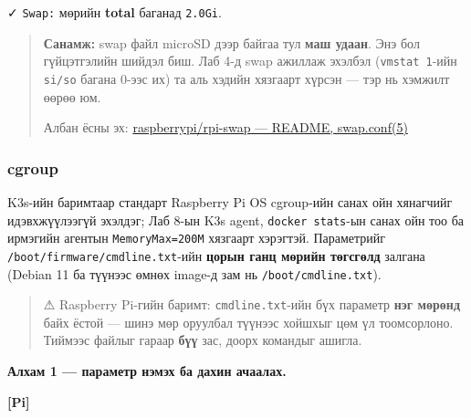 ✓ \texttt{Swap:} мөрийн \textbf{total} баганад \texttt{2.0Gi}.

\begin{quote}
\textbf{Санамж:} swap файл microSD дээр байгаа тул \textbf{маш удаан}. Энэ бол гүйцэтгэлийн шийдэл биш. Лаб 4-д swap ажиллаж эхэлбэл (\texttt{vmstat\ 1}-ийн \texttt{si/so} багана 0-ээс их) та аль хэдийн хязгаарт хүрсэн --- тэр нь хэмжилт өөрөө юм.

Албан ёсны эх: \href{https://github.com/raspberrypi/rpi-swap}{raspberrypi/\allowbreak{}rpi-swap --- README, swap.\allowbreak{}conf(5)}
\end{quote}

\hypertarget{cgroup}{%
\subsubsection{cgroup}\label{cgroup}}

K3s-ийн баримтаар стандарт Raspberry Pi OS cgroup-ийн санах ойн хянагчийг идэвхжүүлээгүй эхэлдэг; Лаб 8-ын K3s agent, \texttt{docker\ stats}-ын санах ойн тоо ба ирмэгийн агентын \texttt{MemoryMax=200M} хязгаарт хэрэгтэй. Параметрийг \texttt{/\allowbreak{}boot/\allowbreak{}firmware/\allowbreak{}cmdline.\allowbreak{}txt}-ийн \textbf{цорын ганц мөрийн төгсгөлд} залгана (Debian 11 ба түүнээс өмнөх image-д зам нь \texttt{/\allowbreak{}boot/\allowbreak{}cmdline.\allowbreak{}txt}).

\begin{quote}
⚠ Raspberry Pi-гийн баримт: \texttt{cmdline.txt}-ийн бүх параметр \textbf{нэг мөрөнд} байх ёстой --- шинэ мөр оруулбал түүнээс хойшхыг цөм үл тоомсорлоно. Тиймээс файлыг гараар \textbf{бүү} зас, доорх командыг ашигла.
\end{quote}

\textbf{Алхам 1 --- параметр нэмэх ба дахин ачаалах.}

\textbf{{[}Pi{]}}

\begin{Shaded}
\begin{Highlighting}[]
\KeywordTok{||} \KeywordTok{\textbackslash{}}
\end{Highlighting}
\end{Shaded}


